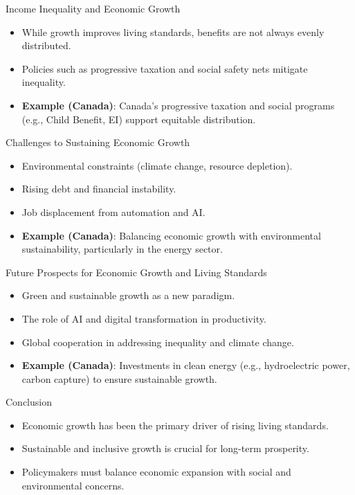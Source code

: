 \documentclass{beamer}
\begin{document}
\begin{frame}{Income Inequality and Economic Growth}
    \begin{itemize}
        \item While growth improves living standards, benefits are not always evenly distributed.
        \item Policies such as progressive taxation and social safety nets mitigate inequality.
        \item \textbf{Example (Canada)}: Canada’s progressive taxation and social programs (e.g., Child Benefit, EI) support equitable distribution.
    \end{itemize}
\end{frame}

\begin{frame}{Challenges to Sustaining Economic Growth}
    \begin{itemize}
        \item Environmental constraints (climate change, resource depletion).
        \item Rising debt and financial instability.
        \item Job displacement from automation and AI.
        \item \textbf{Example (Canada)}: Balancing economic growth with environmental sustainability, particularly in the energy sector.
    \end{itemize}
\end{frame}

\begin{frame}{Future Prospects for Economic Growth and Living Standards}
    \begin{itemize}
        \item Green and sustainable growth as a new paradigm.
        \item The role of AI and digital transformation in productivity.
        \item Global cooperation in addressing inequality and climate change.
        \item \textbf{Example (Canada)}: Investments in clean energy (e.g., hydroelectric power, carbon capture) to ensure sustainable growth.
    \end{itemize}
\end{frame}

\begin{frame}{Conclusion}
    \begin{itemize}
        \item Economic growth has been the primary driver of rising living standards.
        \item Sustainable and inclusive growth is crucial for long-term prosperity.
        \item Policymakers must balance economic expansion with social and environmental concerns.
    \end{itemize}
\end{frame}
\end{document}
